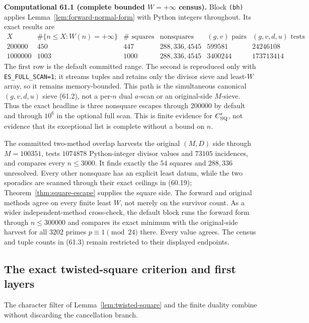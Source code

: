 \documentclass[10pt,reqno]{amsart}
\theoremstyle{definition}
\newcommand{\1}{\mathbf 1}
\begin{document}
\medskip\noindent\textbf{Computational 61.1 (complete bounded
$W=+\infty$ census).}
Block \texttt{(bh)} applies Lemma~\ref{lem:forward-normal-form} with Python
integers throughout.  Its exact results are
\begingroup\scriptsize
\begin{equation}\tag{61.3}
\begin{array}{r|r|r|l|r|r}
X&\#\{n\leq X:W(n)=+\infty\}&\#\text{ squares}&
 \text{nonsquares}&(g,v)\text{ pairs}&(g,v,d,u)\text{ tests}\\ \hline
200000&450&447&288,336,4545&599581&24246108\\
1000000&1003&1000&288,336,4545&3400244&173713414
\end{array}
\end{equation}
\endgroup
The first row is the default committed range.  The second is reproduced
only with \texttt{ES\_FULL\_SCAN=1}; it streams tuples and retains only the
divisor sieve and least-$W$ array, so it remains memory-bounded.  This path
is the simultaneous canonical $(g,v,d,u)$ sieve (61.2), not a per-$n$ dual
$a$-scan or an original-side $M$-sieve.  Thus the exact headline is three
nonsquare escapes through $200000$ by default and through $10^6$ in the
optional full scan.  This is finite evidence for $C_{\rm SQ}'$, not evidence
that its exceptional list is complete without a bound on $n$.

The committed two-method overlap harvests the original $(M,D)$ side through
$M=100351$, tests $1074878$ Python-integer divisor values and $73105$
incidences, and compares every $n\leq3000$.  It finds exactly the $54$
squares and $288,336$ unresolved.  Every other nonsquare has an explicit
least datum, while the two sporadics are scanned through their exact
ceilings in (60.19); Theorem~\ref{thm:square-escape} supplies the square
side.  The forward and original methods agree on every finite least $W$,
not merely on the survivor count.  As a wider independent-method
cross-check, the default block runs the forward form through $n\leq300000$
and compares its exact minimum with the original-side harvest for all
$3202$ primes $p\equiv1\pmod {24}$ there.  Every value agrees.  The census
and tuple counts in (61.3) remain restricted to their displayed endpoints.

\subsection{The exact twisted-square criterion and first layers}
The character filter of Lemma~\ref{lem:twisted-square} and the finite
duality combine without discarding the cancellation branch.
\end{document}
